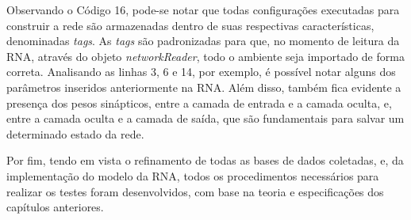 Observando o Código 16, pode-se notar que todas configurações executadas para construir a rede são armazenadas dentro de suas respectivas características, denominadas \textit{tags}. As \textit{tags} são padronizadas para que, no momento de leitura da RNA, através do objeto \textit{networkReader}, todo o ambiente seja importado de forma correta. Analisando as linhas 3, 6 e 14, por exemplo, é possível notar alguns dos parâmetros inseridos anteriormente na RNA. Além disso, também fica evidente a presença dos pesos sinápticos, entre a camada de entrada e a camada oculta, e, entre a camada oculta e a camada de saída, que são fundamentais para salvar um determinado estado da rede.

Por fim, tendo em vista o refinamento de todas as bases de dados coletadas, e, da implementação do modelo da RNA, todos os procedimentos necessários para realizar os testes foram desenvolvidos, com base na teoria e especificações dos capítulos anteriores. 
